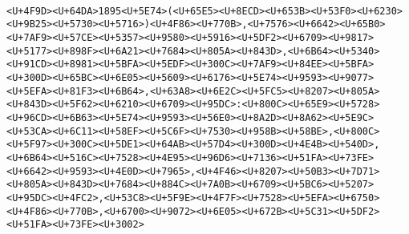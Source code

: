 \documentclass[
]{article}
\begin{document}
\begin{verbatim}
                                                                                                                                                                                                                                                                                                                                                                       <U+4F9D><U+64DA>1895<U+5E74>(<U+65E5><U+8ECD><U+653B><U+53F0><U+6230><U+9B25><U+5730><U+5716>)<U+4F86><U+770B>,<U+7576><U+6642><U+65B0><U+7AF9><U+57CE><U+5357><U+9580><U+5916><U+5DF2><U+6709><U+9817><U+5177><U+898F><U+6A21><U+7684><U+805A><U+843D>,<U+6B64><U+5340><U+91CD><U+8981><U+5BFA><U+5EDF><U+300C><U+7AF9><U+84EE><U+5BFA><U+300D><U+65BC><U+6E05><U+5609><U+6176><U+5E74><U+9593><U+9077><U+5EFA><U+81F3><U+6B64>,<U+63A8><U+6E2C><U+5FC5><U+8207><U+805A><U+843D><U+5F62><U+6210><U+6709><U+95DC>:<U+800C><U+65E9><U+5728><U+96CD><U+6B63><U+5E74><U+9593><U+56E0><U+8A2D><U+8A62><U+5E9C><U+53CA><U+6C11><U+58EF><U+5C6F><U+7530><U+958B><U+58BE>,<U+800C><U+5F97><U+300C><U+5DE1><U+64AB><U+57D4><U+300D><U+4E4B><U+540D>,<U+6B64><U+516C><U+7528><U+4E95><U+96D6><U+7136><U+51FA><U+73FE><U+6642><U+9593><U+4E0D><U+7965>,<U+4F46><U+8207><U+50B3><U+7D71><U+805A><U+843D><U+7684><U+884C><U+7A0B><U+6709><U+5BC6><U+5207><U+95DC><U+4FC2>,<U+53C8><U+5F9E><U+4F7F><U+7528><U+5EFA><U+6750><U+4F86><U+770B>,<U+6700><U+9072><U+6E05><U+672B><U+5C31><U+5DF2><U+51FA><U+73FE><U+3002>

\end{verbatim}
\end{document}
